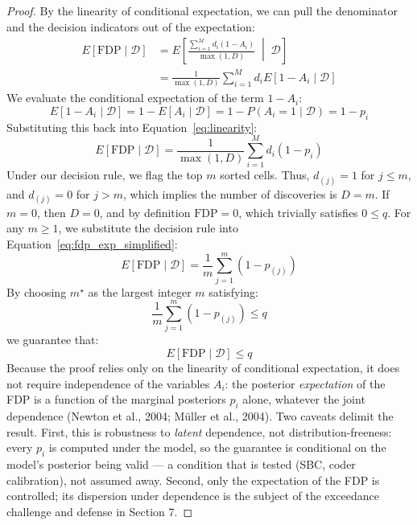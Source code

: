 \documentclass[11pt,a4paper]{article}
\begin{document}
\begin{proof}
By the linearity of conditional expectation, we can pull the denominator and the decision indicators out of the expectation:
\begin{align}
    E[\text{FDP} \mid \mathcal{D}] &= E\left[ \frac{\sum_{i=1}^M d_i (1 - A_i)}{\max(1, D)} \;\middle|\; \mathcal{D} \right] \nonumber \\
    &= \frac{1}{\max(1, D)} \sum_{i=1}^M d_i E[1 - A_i \mid \mathcal{D}] \label{eq:linearity}
\end{align}
We evaluate the conditional expectation of the term $1 - A_i$:
\[
E[1 - A_i \mid \mathcal{D}] = 1 - E[A_i \mid \mathcal{D}] = 1 - P(A_i = 1 \mid \mathcal{D}) = 1 - p_i
\]
Substituting this back into Equation~\eqref{eq:linearity}:
\begin{equation}\label{eq:fdp_exp_simplified}
E[\text{FDP} \mid \mathcal{D}] = \frac{1}{\max(1, D)} \sum_{i=1}^M d_i (1 - p_i)
\end{equation}
Under our decision rule, we flag the top $m$ sorted cells. Thus, $d_{(j)} = 1$ for $j \le m$, and $d_{(j)} = 0$ for $j > m$, which implies the number of discoveries is $D = m$.
If $m = 0$, then $D = 0$, and by definition $\text{FDP} = 0$, which trivially satisfies $0 \le q$.
For any $m \ge 1$, we substitute the decision rule into Equation~\eqref{eq:fdp_exp_simplified}:
\[
E[\text{FDP} \mid \mathcal{D}] = \frac{1}{m} \sum_{j=1}^m (1 - p_{(j)})
\]
By choosing $m^\star$ as the largest integer $m$ satisfying:
\[
\frac{1}{m} \sum_{j=1}^m (1 - p_{(j)}) \le q
\]
we guarantee that:
\[
E[\text{FDP} \mid \mathcal{D}] \le q
\]
Because the proof relies only on the linearity of conditional expectation, it does not require independence of the variables $A_i$: the posterior \emph{expectation} of the FDP is a function of the marginal posteriors $p_i$ alone, whatever the joint dependence (Newton et al., 2004; M\"uller et al., 2004). Two caveats delimit the result. First, this is robustness to \emph{latent} dependence, not distribution-freeness: every $p_i$ is computed under the model, so the guarantee is conditional on the model's posterior being valid --- a condition that is tested (SBC, coder calibration), not assumed away. Second, only the expectation of the FDP is controlled; its dispersion under dependence is the subject of the exceedance challenge and defense in Section 7. %
\end{proof}
\end{document}
